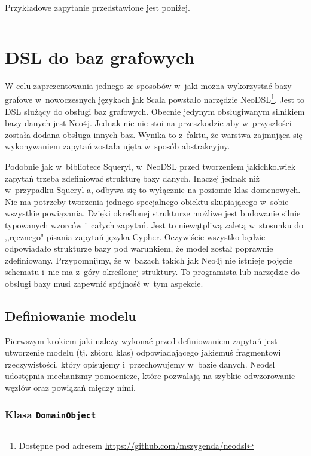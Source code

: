 \documentclass[brudnopis]{xmgr}
\begin{document}
\medskip\noindent Przykładowe zapytanie przedstawione jest poniżej.

\inputminted{scala}{listings/scala/rogue-query.scala}

\chapter{DSL do baz grafowych}

W celu zaprezentowania jednego ze sposobów w~jaki można wykorzystać bazy grafowe w~nowoczesnych językach jak Scala powstało narzędzie NeoDSL\footnote{Dostępne pod adresem \url{https://github.com/mszygenda/neodsl}}. Jest to DSL służący do obsługi baz grafowych.
Obecnie jedynym obsługiwanym silnikiem bazy danych jest Neo4j. Jednak nic nie stoi na przeszkodzie aby w~przyszłości została dodana obsługa innych baz. Wynika to z~faktu, że warstwa zajmująca się wykonywaniem zapytań została ujęta w~sposób abstrakcyjny.

Podobnie jak w~bibliotece Squeryl, w~NeoDSL przed tworzeniem jakichkolwiek zapytań trzeba zdefiniować strukturę bazy danych. Inaczej jednak niż w~przypadku Squeryl-a, odbywa się to wyłącznie na poziomie klas domenowych. Nie ma potrzeby tworzenia jednego specjalnego obiektu skupiającego w~sobie wszystkie powiązania. Dzięki określonej strukturze możliwe jest budowanie silnie typowanych wzorców i~całych zapytań. Jest to niewątpliwą zaletą w~stosunku do ,,ręcznego" pisania zapytań języka Cypher. Oczywiście wszystko będzie odpowiadało strukturze bazy pod warunkiem, że model został poprawnie zdefiniowany. Przypomnijmy, że w~bazach takich jak Neo4j nie istnieje pojęcie schematu i~nie ma z~góry określonej struktury. To programista lub narzędzie do obsługi bazy musi zapewnić spójność w~tym aspekcie.

\section{Definiowanie modelu}

Pierwszym krokiem jaki należy wykonać przed definiowaniem zapytań jest utworzenie modelu (tj. zbioru klas) odpowiadającego jakiemuś fragmentowi rzeczywistości, który opisujemy i~przechowujemy w~bazie danych. Neodsl udostępnia mechanizmy pomocnicze, które pozwalają na szybkie odwzorowanie węzłów oraz powiązań między nimi.

\subsection{Klasa \texttt{DomainObject}}
\end{document}
